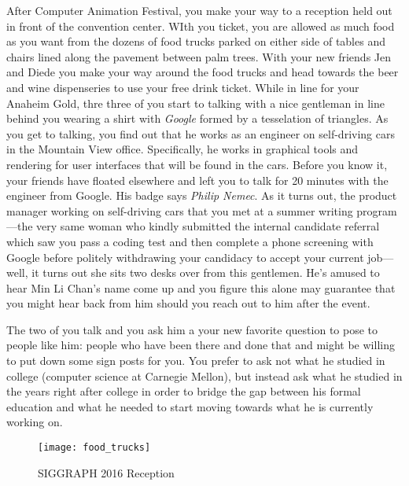 \documentclass[../main.tex]{subfiles}
\begin{document}
After Computer Animation Festival, you make your way to a reception held out in front of the convention center. WIth you ticket, you are allowed as much food as you want from the dozens of food trucks parked on either side of tables and chairs lined along the pavement between palm trees. With your new friends Jen and Diede you make your way around the food trucks and head towards the beer and wine dispenseries to use your free drink ticket. While in line for your Anaheim Gold, thre three of you start to talking with a nice gentleman in line behind you wearing a shirt with \textit{Google} formed by a tesselation of triangles. As you get to talking, you find out that he works as an engineer on self-driving cars in the Mountain View office. Specifically, he works in graphical tools and rendering for user interfaces that will be found in the cars. Before you know it, your friends have floated elsewhere and left you to talk for 20 minutes with the engineer from Google. His badge says \textit{Philip Nemec}. As it turns out, the product manager working on self-driving cars that you met at a summer writing program---the very same woman who kindly submitted the internal candidate referral which saw you pass a coding test and then complete a phone screening with Google before politely withdrawing your candidacy to accept your current job---well, it turns out she sits two desks over from this gentlemen. He's amused to hear Min Li Chan's name come up and you figure this alone may guarantee that you might hear back from him should you reach out to him after the event.

The two of you talk and you ask him a your new favorite question to pose to people like him: people who have been there and done that and might be willing to put down some sign posts for you. You prefer to ask not what he studied in college (computer science at Carnegie Mellon), but instead ask what he studied in the years right after college in order to bridge the gap between his formal education and what he needed to start moving towards what he is currently working on.


\begin{figure}[h!]
	\centering
	\texttt{[image: food\_trucks]}
	\caption*{SIGGRAPH 2016 Reception}
\end{figure}
\end{document}
